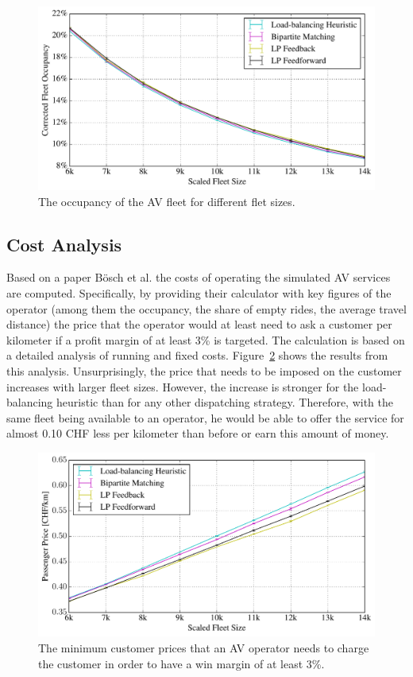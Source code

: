 \begin{figure}
\includegraphics[width=1.0\textwidth]{figures/occupancy.pdf}
\caption{The occupancy of the AV fleet for different flet sizes.}
\label{fig:occupancy}
\end{figure}

\subsection{Cost Analysis}
\label{sec:cost_analysis}

Based on a paper Bösch et al. \cite{cost_paper} the costs of operating the simulated AV services are computed. Specifically, by providing their calculator with key figures of the operator (among them the occupancy, the share of empty rides, the
average travel distance) the price that the operator would at least need to ask a customer per kilometer if a profit margin of at least 3\% is targeted. The calculation is based on a detailed analysis of running and fixed costs. Figure~\ref{fig:passenger_price}
shows the results from this analysis. Unsurprisingly, the price that needs to be imposed on the customer increases with larger fleet sizes. However, the increase is stronger for the load-balancing heuristic than for any other dispatching strategy.
Therefore, with the same fleet being available to an operator, he would be able to offer the service for almost 0.10 CHF less per kilometer than before or earn this amount of money.

\begin{figure}
\includegraphics[width=1.0\textwidth]{figures/01_passenger_price.pdf}
\caption{The minimum customer prices that an AV operator needs to charge the customer
in order to have a win margin of at least 3\%.}
\label{fig:passenger_price}
\end{figure}

